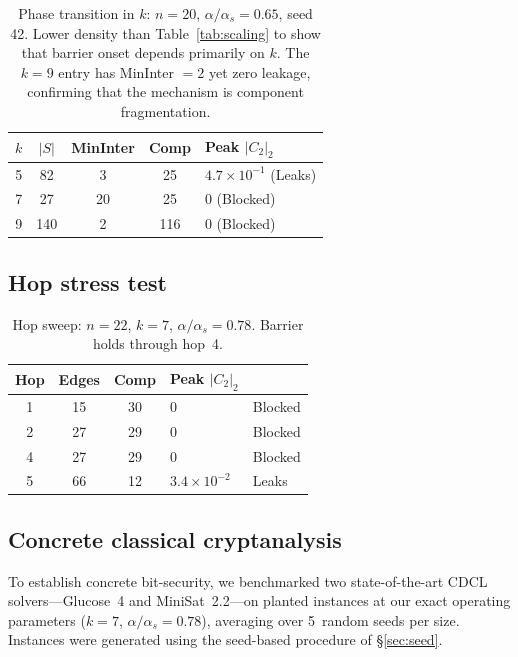 \documentclass[11pt]{article}
\begin{document}
\begin{table}[ht]
\centering
\caption{Phase transition in $k$: $n = 20$, $\alpha/\alpha_s = 0.65$, seed 42.  Lower density than Table~\ref{tab:scaling} to show that barrier onset depends primarily on $k$.  The $k = 9$ entry has MinInter $= 2$ yet zero leakage, confirming that the mechanism is component fragmentation.}\label{tab:kphase}
\begin{tabular}{@{}ccccl@{}}
\toprule
$k$ & $|S|$ & MinInter & Comp & Peak $|C_2|_2$ \\
\midrule
5 & 82 & 3 & 25 & $4.7 \times 10^{-1}$ (Leaks) \\
7 & 27 & 20 & 25 & 0 (Blocked) \\
9 & 140 & 2 & 116 & 0 (Blocked) \\
\bottomrule
\end{tabular}
\end{table}


\subsection{Hop stress test}

\begin{table}[ht]
\centering
\caption{Hop sweep: $n = 22$, $k = 7$, $\alpha/\alpha_s = 0.78$.  Barrier holds through hop~4.}\label{tab:hop}
\begin{tabular}{@{}cccll@{}}
\toprule
Hop & Edges & Comp & Peak $|C_2|_2$ & \\
\midrule
1 & 15 & 30 & 0 & Blocked \\
2 & 27 & 29 & 0 & Blocked \\
4 & 27 & 29 & 0 & Blocked \\
5 & 66 & 12 & $3.4 \times 10^{-2}$ & Leaks \\
\bottomrule
\end{tabular}
\end{table}


\subsection{Concrete classical cryptanalysis}\label{sec:concrete}

To establish concrete bit-security, we benchmarked two state-of-the-art CDCL solvers---Glucose~4 and MiniSat~2.2---on planted instances at our exact operating parameters ($k = 7$, $\alpha/\alpha_s = 0.78$), averaging over 5~random seeds per size.  Instances were generated using the seed-based procedure of \S\ref{sec:seed}.
\end{document}
